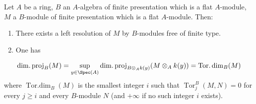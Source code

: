 \begin{proposition}[12.3.2]
\label{IV.12.3.2}
Let $A$ be a ring, $B$ an $A$-algebra of finite presentation which is a flat $A$-module, $M$ a $B$-module of finite presentation which is a flat $A$-module.
Then:
\begin{enumerate}[label=(\roman*)]
  \item There exists a left resolution of $M$ by $B$-modules free of finite type.
  \item One has
\end{enumerate}
\begin{equation}
\label{IV.12.3.2.1}
\operatorname{dim.proj}_B(M) = \sup_{y\in\Spec(A)} \operatorname{dim.proj}_{B\otimes_A k(y)}(M\otimes_A k(y)) = \operatorname{Tor.dim}_B(M)
\end{equation}
where $\operatorname{Tor.dim}_B(M)$ is the smallest integer $i$ such that $\operatorname{Tor}_j^B(M,N)=0$ for every $j\geqslant i$ and every $B$-module $N$ (and $+\infty$ if no such integer $i$ exists).
\end{proposition}

